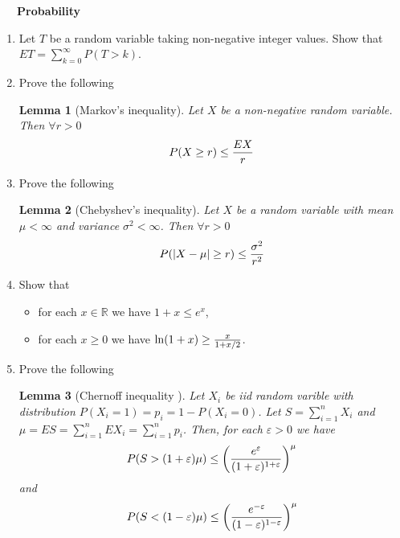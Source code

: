 \documentclass[a4paper,12pt]{article}
\newtheorem{lem}{Lemma}
\begin{document}
 
\noindent
 {
\setlength\fboxsep{4pt}%
 \setlength\fboxrule{2pt}%
 } \bigskip\bigskip
\par \bigskip

 
 
\ \ \ \textbf{Probability}

\begin{enumerate}

\item Let  $T$ be a random variable taking non-negative integer values.
Show that  $ET=\sum_{k=0}^\infty P(T>k)$.


\item Prove the following
\begin{lem}[Markov's inequality]  Let  $X$ be a non-negative random variable. Then
 $\forall r>0$
$$P(X\geq r)\leq{EX\over r}$$
\end{lem}


\item   Prove the following
\begin{lem}[Chebyshev's inequality] Let $X$ be a random variable with mean $\mu<\infty$
and variance $\sigma^2<\infty$.
Then  $\forall r>0$
$$P(|X-\mu|\geq r)\leq{\sigma^2\over r^2}$$
\end{lem}

\item Show that 
\begin{itemize}
 \item for each $x\in\mathbb{R}$ we have  $1+x\leq e^x$,
 \item for each $x\geq 0$ we have  $\ln(1+x)\geq {x\over 1+x/2}$.
\end{itemize}




\item  Prove the following
\begin{lem}[Chernoff  inequality ] Let $X_i$ be iid random 
varible with distribution $P(X_i=1)=p_i=1-P(X_i=0)$.
Let $S=\sum_{i=1}^n X_i$ and  $\mu=ES=\sum_{i=1}^n EX_i=\sum_{i=1}^n p_i$. 
Then, for each  $\varepsilon>0$ we have 
$$P(S>(1+\varepsilon)\mu)\leq\left(e^\varepsilon\over (1+\varepsilon)^{1+\varepsilon}\right)^\mu$$ 
and
$$P(S<(1-\varepsilon)\mu)\leq\left(e^{-\varepsilon}\over (1-\varepsilon)^{1-\varepsilon}\right)^\mu$$ 


\end{lem}
\end{enumerate}
\end{document}
